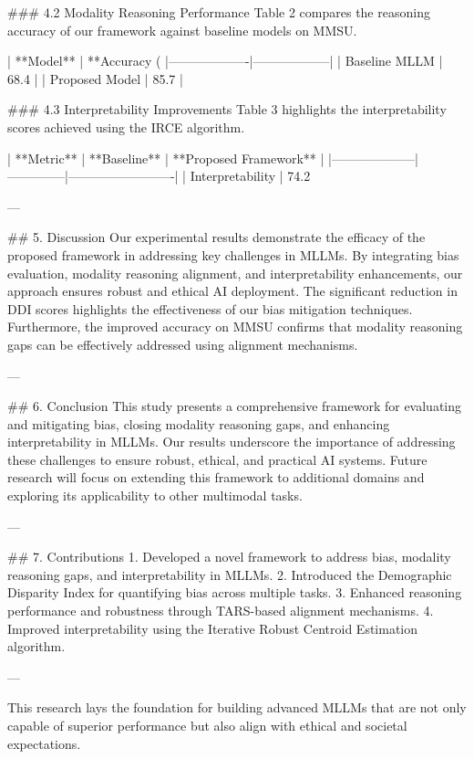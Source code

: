 ### 4.2 Modality Reasoning Performance  
Table 2 compares the reasoning accuracy of our framework against baseline models on MMSU.  

| **Model**        | **Accuracy (%
|-------------------|------------------|  
| Baseline MLLM     | 68.4             |  
| Proposed Model    | 85.7             |  

### 4.3 Interpretability Improvements  
Table 3 highlights the interpretability scores achieved using the IRCE algorithm.  

| **Metric**        | **Baseline** | **Proposed Framework** |  
|--------------------|--------------|-------------------------|  
| Interpretability   | 74.2%

---

## 5. Discussion  
Our experimental results demonstrate the efficacy of the proposed framework in addressing key challenges in MLLMs. By integrating bias evaluation, modality reasoning alignment, and interpretability enhancements, our approach ensures robust and ethical AI deployment. The significant reduction in DDI scores highlights the effectiveness of our bias mitigation techniques. Furthermore, the improved accuracy on MMSU confirms that modality reasoning gaps can be effectively addressed using alignment mechanisms.

---

## 6. Conclusion  
This study presents a comprehensive framework for evaluating and mitigating bias, closing modality reasoning gaps, and enhancing interpretability in MLLMs. Our results underscore the importance of addressing these challenges to ensure robust, ethical, and practical AI systems. Future research will focus on extending this framework to additional domains and exploring its applicability to other multimodal tasks.

---

## 7. Contributions  
1. Developed a novel framework to address bias, modality reasoning gaps, and interpretability in MLLMs.  
2. Introduced the Demographic Disparity Index for quantifying bias across multiple tasks.  
3. Enhanced reasoning performance and robustness through TARS-based alignment mechanisms.  
4. Improved interpretability using the Iterative Robust Centroid Estimation algorithm.  

--- 

This research lays the foundation for building advanced MLLMs that are not only capable of superior performance but also align with ethical and societal expectations.
